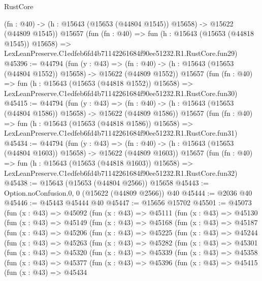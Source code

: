 \begin{lexlean}{RustCore}
\begin{coremodule}
    (fn : @40) -> (h : @15643 (@15653 (@44804 @1545)) @15658) -> @15622 (@44809 @1545))
    @15657
    (fun (fn : @40) =>
    fun (h : @15643 (@15653 (@44818 @1545)) @15658) =>
    LexLeanPreserve.C1edfeb6fd4b71142261684f90ee51232.R1.RustCore.fun29)
@45396 := @44794
    (fun (y : @43) =>
    (fn : @40) -> (h : @15643 (@15653 (@44804 @1552)) @15658) -> @15622 (@44809 @1552))
    @15657
    (fun (fn : @40) =>
    fun (h : @15643 (@15653 (@44818 @1552)) @15658) =>
    LexLeanPreserve.C1edfeb6fd4b71142261684f90ee51232.R1.RustCore.fun30)
@45415 := @44794
    (fun (y : @43) =>
    (fn : @40) -> (h : @15643 (@15653 (@44804 @1586)) @15658) -> @15622 (@44809 @1586))
    @15657
    (fun (fn : @40) =>
    fun (h : @15643 (@15653 (@44818 @1586)) @15658) =>
    LexLeanPreserve.C1edfeb6fd4b71142261684f90ee51232.R1.RustCore.fun31)
@45434 := @44794
    (fun (y : @43) =>
    (fn : @40) -> (h : @15643 (@15653 (@44804 @1603)) @15658) -> @15622 (@44809 @1603))
    @15657
    (fun (fn : @40) =>
    fun (h : @15643 (@15653 (@44818 @1603)) @15658) =>
    LexLeanPreserve.C1edfeb6fd4b71142261684f90ee51232.R1.RustCore.fun32)
@45438 := @15643 (@15653 (@44804 @2566)) @15658
@45443 := Option.noConfusion.{0, 0} (@15622 (@44809 @2566)) @40
@45444 := @2036 @40
@45446 := @45443 @45444 @40
@45447 := @15656 @15702
@45501 := @45073
    (fun (x : @43) =>
    @45092
      (fun (x : @43) =>
      @45111
        (fun (x : @43) =>
        @45130
          (fun (x : @43) =>
          @45149
            (fun (x : @43) =>
            @45168
              (fun (x : @43) =>
              @45187
                (fun (x : @43) =>
                @45206
                  (fun (x : @43) =>
                  @45225
                    (fun (x : @43) =>
                    @45244
                      (fun (x : @43) =>
                      @45263
                        (fun (x : @43) =>
                        @45282
                          (fun (x : @43) =>
                          @45301
                            (fun (x : @43) =>
                            @45320
                              (fun (x : @43) =>
                              @45339
                                (fun (x : @43) =>
                                @45358
                                  (fun (x : @43) =>
                                  @45377
                                    (fun (x : @43) =>
                                    @45396
                                      (fun (x : @43) =>
                                      @45415
                                        (fun (x : @43) =>
                                        @45434

\end{coremodule}
\end{lexlean}
